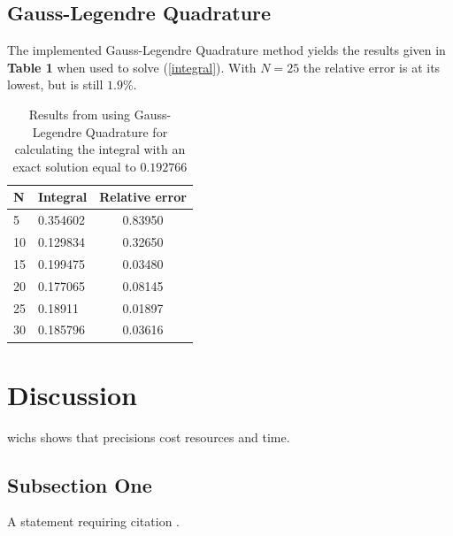 \documentclass[twoside,twocolumn]{article}
\begin{document}
\subsection{Gauss-Legendre Quadrature}
The implemented Gauss-Legendre Quadrature method yields the results given in \textbf{Table 1} when used to solve (\ref{integral}). With $N=25$ the relative error is at its lowest, but is still $1.9 \%$.


\par
\begin{table}[h]

\begin{center}
\begin{threeparttable}
\begin{tabular}{|l|l|c|}
\hline
N  & Integral & \multicolumn{1}{l|}{Relative error} \\ \hline
5  & 0.354602 & 0.83950         \\ \hline
10 & 0.129834 & 0.32650         \\ \hline
15 & 0.199475 & 0.03480         \\ \hline
20 & 0.177065 & 0.08145        \\ \hline
25 & 0.18911  & 0.01897        \\ \hline
30 & 0.185796 & 0.03616        \\ \hline
\end{tabular}
\end{threeparttable}
\end{center}
\label{table:tableLegendre}
\caption{Results from using Gauss-Legendre Quadrature for calculating the integral with an exact solution equal to $0.192766$}
\end{table}



\section{Discussion}
wichs shows that precisions cost resources and time.
\subsection{Subsection One}

A statement requiring citation \cite{Figueredo:2009dg}.
\blindtext %
\end{document}
